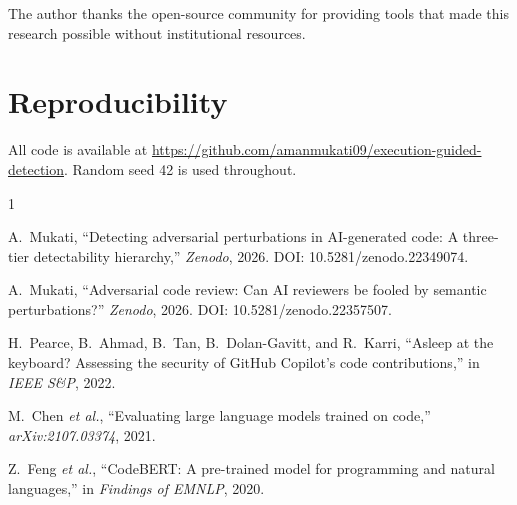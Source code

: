 \documentclass[conference]{IEEEtran}
\begin{document}
The author thanks the open-source community for providing tools that made this research possible without institutional resources.

\section*{Reproducibility}

All code is available at \url{https://github.com/amanmukati09/execution-guided-detection}. Random seed 42 is used throughout.


\begin{thebibliography}{1}

A.~Mukati, ``Detecting adversarial perturbations in AI-generated code: A three-tier detectability hierarchy,'' \emph{Zenodo}, 2026. DOI: 10.5281/zenodo.22349074.

A.~Mukati, ``Adversarial code review: Can AI reviewers be fooled by semantic perturbations?'' \emph{Zenodo}, 2026. DOI: 10.5281/zenodo.22357507.

H.~Pearce, B.~Ahmad, B.~Tan, B.~Dolan-Gavitt, and R.~Karri, ``Asleep at the keyboard? Assessing the security of GitHub Copilot's code contributions,'' in \emph{IEEE S\&P}, 2022.

M.~Chen \emph{et al.}, ``Evaluating large language models trained on code,'' \emph{arXiv:2107.03374}, 2021.

Z.~Feng \emph{et al.}, ``CodeBERT: A pre-trained model for programming and natural languages,'' in \emph{Findings of EMNLP}, 2020.

\end{thebibliography}
\end{document}
